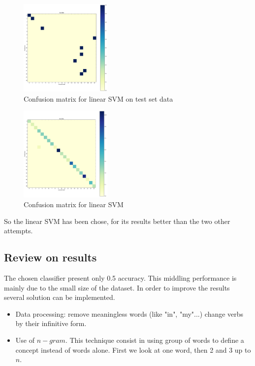 \begin{multicols}{2}
\begin{figure}[H]
	\centering
	\includegraphics[width=0.4\textwidth]{classifier_svm_linear_test}
	\caption{Confusion matrix for linear SVM on test set data}
	\label{svm_test}
\end{figure}

\begin{figure}[H]
	\centering
	\includegraphics[width=0.4\textwidth]{classifier_svm_linear}
	\caption{Confusion matrix for linear SVM}
	\label{svm_linear}
\end{figure}
\end{multicols}

So the linear SVM has been chose, for its results better than the two other attempts. 

\subsection{Review on results}

The chosen classifier present only 0.5 accuracy. This middling performance is mainly due to the small size of the dataset. In order to improve the results several solution can be implemented.
\begin{itemize}
	\item Data processing: remove meaningless words (like "in", "my"...) change verbs by their infinitive form.
	\item Use of $n-gram$. This technique consist in using group of words to define a concept instead of words alone. First we look at one word, then 2 and 3 up to $n$.
\end{itemize}

